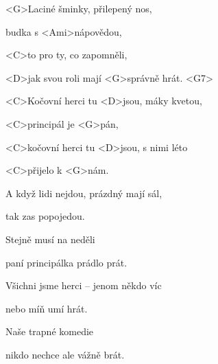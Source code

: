 
\zs
<G>Laciné šminky, přilepený nos,

budka s <Ami>nápovědou,

<C>to pro ty, co zapomněli,

<D>jak svou roli mají <G>správně hrát. <G7>
\ks
\zr

<C>Kočovní herci tu <D>jsou, máky kvetou,

<C>principál je <G>pán,

<C>kočovní herci tu <D>jsou, s nimi léto

<C>přijelo k <G>nám.
\kr
\zs

A když lidi nejdou, prázdný mají sál,

tak zas popojedou.

Stejně musí na neděli

paní principálka prádlo prát.

\ks
\zr \kr
\zs

Všichni jsme herci -- jenom někdo víc

nebo míň umí hrát.

Naše trapné komedie

nikdo nechce ale vážně brát.
\ks

\zr
\kr

\kp
